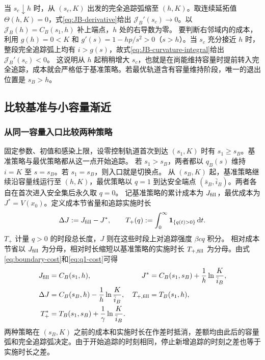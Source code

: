 \documentclass[lang=cn,a4paper,newtx]{elegantpaper}
\theoremstyle{plain}
\theoremstyle{definition}
\newcommand{\dd}{\,\mathrm d}
\newcommand{\one}{\mathbf 1}
\begin{document}
当 $s_c\downarrow h$ 时，从 $(s_c,K)$ 出发的完全追踪弧缩至 $(h,K)$。取连续延拓值 $\Theta(h,K)=0$，式\eqref{eq:JB-derivative}给出 $\mathcal J_B'(s_c)\to0$。以 $\mathcal J_B(h)=C_B(s_1,h)$ 补上端点，$h$ 处的右导数为零。
要判断右邻域内的成本，利用 $g(h)=0<K$ 和 $g'(s)=1-hp/s^2>0$（$s>h$）。当 $s_c$ 充分接近 $h$ 时，整段完全追踪弧上均有 $i>g(s)$，故式\eqref{eq:JB-curvature-integral}给出 $\mathcal J_B'(s_c)<0$。
这说明从 $h$ 起稍稍增大 $s_c$，也就是在尚能维持容量时提前转入完全追踪，成本就会严格低于基准策略。若最优轨道含有容量维持阶段，唯一的退出位置是 $s_B>h$。

\subsection{比较基准与小容量渐近}
\label{sec:scaling}

\subsubsection{从同一容量入口比较两种策略}
固定参数、初值和感染上限，设零控制轨道首次到达 $(s_1,K)$ 时有 $s_1\ge s_B$。基准策略与最优策略都从这一点开始追踪。
若 $s_1>s_B$，两者都以 $q_B(s)$ 维持 $i=K$ 至 $s=s_B$。若 $s_1=s_B$，则入口就是切换点。
从 $(s_B,K)$ 起，基准策略继续沿容量线运行至 $(h,K)$，最优策略以 $q=1$ 到达安全端点 $(\bar s_B,\bar i_B)$。两者各自在首次进入安全集后永久取 $q=0$。
记基准策略的累计成本为 $J_{\rm fill}$，最优成本为 $J^*=V(x_0)$。定义成本节省量和追踪实施时长
\begin{equation}
 \Delta J:=J_{\rm fill}-J^*,\qquad
 T_+(q):=\int_0^\infty\one_{\{q(t)>0\}}\dd t.
 \label{eq:scaling-metrics}
\end{equation}
$T_+$ 计量 $q>0$ 的时段总长度，$J$ 则在这些时段上对追踪强度 $\beta c q$ 积分。
相对成本节省以 $J_{\rm fill}$ 为分母，相对时长缩短以基准策略的实施时长 $T_{+,\rm fill}$ 为分母。由式\eqref{eq:boundary-cost}和\eqref{eq:q1-cost}可得
\begin{align}
 J_{\rm fill}&=C_B(s_1,h),&
 J^*&=C_B(s_1,s_B)+\frac1h\ln\frac K{\bar i_B},\notag\\
 \Delta J&=C_B(s_B,h)-\frac1h\ln\frac K{\bar i_B},&
 T_{+,\rm fill}&=T_B(s_1,h),\notag\\
 T_+^*&=T_B(s_1,s_B)+\frac1\gamma\ln\frac K{\bar i_B}.&&
 \label{eq:common-capacity-comparison}
\end{align}
两种策略在 $(s_B,K)$ 之前的成本和实施时长在作差时抵消，差额均由此后的容量弧和完全追踪弧决定。由于开始追踪的时刻相同，停止新增追踪的时刻之差也等于实施时长之差。
\end{document}
